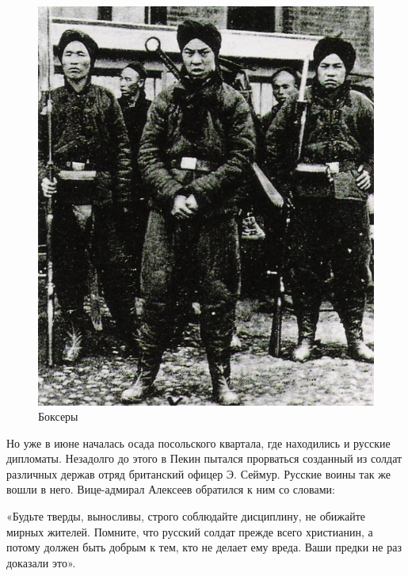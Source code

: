 \begin{figure}[h!tb] 
	\centering\includegraphics[scale=0.5]{Data/RYAV_predposylki/hk4dFO3QF1g.jpg}
	\caption{Боксеры
	}%
\end{figure}

Но уже в июне началась осада посольского квартала, где находились и русские дипломаты. Незадолго до этого в Пекин пытался прорваться созданный из солдат различных держав отряд британский офицер Э. Сеймур. Русские воины так же вошли в него. Вице-адмирал Алексеев обратился к ним со словами:

\begin{textcitation}
	«Будьте тверды, выносливы, строго соблюдайте дисциплину, не обижайте мирных жителей. Помните, что русский солдат прежде всего христианин, а потому должен быть добрым к тем, кто не делает ему вреда. Ваши предки не раз доказали это».
\end{textcitation}

